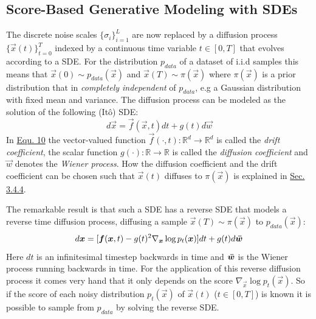\subsection{Score-Based Generative Modeling with SDEs} \label{sec:3.4.1}
The discrete noise scales $\{\sigma_i\}_{i=1}^L$ are now replaced by a diffusion process $\{\vec{x}(t)\}_{t=0}^T$ indexed by a continuous time variable $t\in[0,T]$ that evolves according to a SDE. For the distribution $p_{data}$ of a dataset of i.i.d samples this means that $\vec{x}(0)\sim p_{data}(\vec{x})$ and $\vec{x}(T)\sim \pi(\vec{x})$ where $\pi(\vec{x})$ is a prior distribution that in \textit{completely independent} of $p_{data}$, e.g a Gaussian distribution with fixed mean and variance. The diffusion process can be modeled as the solution of the following (Itô) SDE:
%
\begin{equation} \label{equ:3.10}
    d\vec{x}=\vec{f}(\vec{x},t)dt+g(t)d\vec{w}
\end{equation}
%
In \hyperref[equ:3.10]{Equ. 10} the vector-valued function $\vec{f}(\cdot,t):\mathbb{R}^d\rightarrow\mathbb{R}^d$ is called the \textit{drift coefficient}, the scalar function $g(\cdot):\mathbb{R}\rightarrow\mathbb{R}$ is called the \textit{diffusion coefficient} and $\vec{w}$ denotes the \textit{Wiener process}. How the diffusion coefficient and the drift coefficient can be chosen such that $\vec{x}(t)$ diffuses to $\pi(\vec{x})$ is explained in \hyperref[sec:3.4.4]{Sec. 3.4.4}.

The remarkable result \cite{ANDERSON} is that such a SDE has a reverse SDE that models a reverse time diffusion process, diffusing a sample $\vec{x}(T)\sim\pi(\vec{x})$ to $p_{data}(\vec{x})$:
%
\begin{equation} \label{equ:3.11}
    d\vec{x}=[\vec{f}(\vec{x},t)-g(t)^2\nabla_{\vec{x}}\log p_t(\vec{x})]dt+g(t)d\vec{\Bar{w}}
\end{equation}
%
Here $dt$ is an infinitesimal timestep backwards in time and $\vec{\Bar{w}}$ is the Wiener process running backwards in time. For the application of this reverse diffusion process it comes very hand that it only depends on the score $\nabla_{\vec{x}}\log p_t(\vec{x})$. So if the score of each noisy distribution $p_t(\vec{x})$ of $\vec{x}(t)$ ($t\in[0, T]$) is known it is possible to sample from $p_{data}$ by solving the reverse SDE.
%
